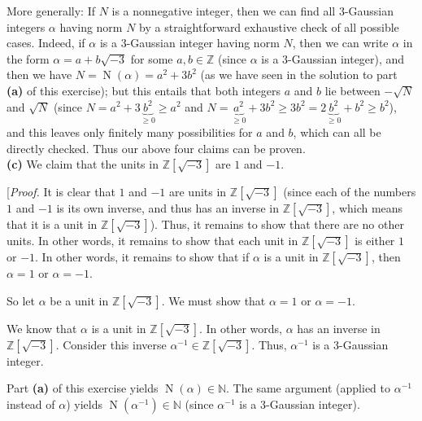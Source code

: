 \documentclass[paper=a4, fontsize=12pt]{scrartcl}%
\newcommand{\NN}{\mathbb{N}}
\newcommand{\ZZ}{\mathbb{Z}}
\newcommand{\tup}[1]{\left( #1 \right)}
\newcommand{\ive}[1]{\left[ #1 \right]}
\newcommand{\st}{\sqrt{-3}}
\newcommand{\Zst}{\ZZ\ive{\sqrt{-3}}}
\newcommand{\No}{\operatorname{N}}
\theoremstyle{plainsl}
\theoremstyle{definition}
\theoremstyle{remark}
\begin{document}
More generally:
If $N$ is a nonnegative integer, then we can find all $3$-Gaussian
integers $\alpha$ having norm $N$ by a straightforward exhaustive
check of all possible cases.
Indeed, if $\alpha$ is a $3$-Gaussian integer having norm $N$,
then we can write $\alpha$ in the form $\alpha = a + b \st$ for some
$a, b \in \ZZ$ (since $\alpha$ is a $3$-Gaussian integer), and then
we have $N = \No\tup{\alpha} = a^2 + 3 b^2$ (as we have seen in the
solution to part \textbf{(a)} of this exercise); but this entails
that both integers $a$ and $b$ lie between $-\sqrt{N}$ and $\sqrt{N}$
(since $N = a^2 + 3 \underbrace{b^2}_{\geq 0} \geq a^2$ and
$N = \underbrace{a^2}_{\geq 0} + 3 b^2 \geq 3 b^2
= 2 \underbrace{b^2}_{\geq 0} + b^2 \geq b^2$), and this leaves
only finitely many possibilities for $a$ and $b$, which can all
be directly checked.
Thus our above four claims can be proven. \\[0.4cm]

\textbf{(c)}
We claim that the units in $\Zst$ are $1$ and $-1$.

[\textit{Proof.} It is clear that $1$ and $-1$ are units in $\Zst$
(since each of the numbers $1$ and $-1$ is its own inverse, and
thus has an inverse in $\Zst$, which means that it is a unit in
$\Zst$).
Thus, it remains to show that there are no other units.
In other words, it remains to show that each unit in $\Zst$ is
either $1$ or $-1$.
In other words, it remains to show that if $\alpha$ is a unit
in $\Zst$, then $\alpha = 1$ or $\alpha = -1$.

So let $\alpha$ be a unit in $\Zst$.
We must show that $\alpha = 1$ or $\alpha = -1$.

We know that $\alpha$ is a unit in $\Zst$.
In other words, $\alpha$ has an inverse in $\Zst$.
Consider this inverse $\alpha^{-1} \in \Zst$.
Thus, $\alpha^{-1}$ is a $3$-Gaussian integer.

Part \textbf{(a)} of this exercise yields
$\No\tup{\alpha} \in \NN$. The same argument (applied to $\alpha^{-1}$
instead of $\alpha$) yields $\No\tup{\alpha^{-1}} \in \NN$
(since $\alpha^{-1}$ is a $3$-Gaussian integer).
\end{document}
